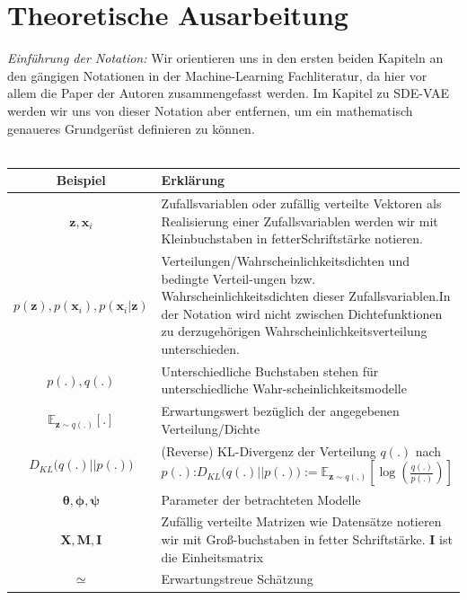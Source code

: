 \documentclass[12pt]{article}
\newcommand{\E}{\mathbb{E}}
\newcommand{\z}{\mathbf{z}}
\newcommand{\x}{\mathbf{x}_i}
\begin{document}
	\section[Theoretische Ausarbeitung]{Theoretische Ausarbeitung}
	\emph{Einführung der Notation:} Wir orientieren uns in den ersten beiden Kapiteln an den gängigen Notationen in der Machine-Learning Fachliteratur, da hier vor allem die Paper der Autoren zusammengefasst werden. Im Kapitel zu SDE-VAE werden wir uns von dieser Notation aber entfernen, um ein mathematisch genaueres Grundgerüst definieren zu können.\\ \
	\\
	\begin{tabular}{|c|p{11.9cm}|}
			\hline
			\textbf{Beispiel} & \textbf{Erklärung}  \\
			\hline
			$\z, \x$ &  Zufallsvariablen oder zufällig verteilte Vektoren als Realisierung \newline einer Zufallsvariablen werden wir mit Kleinbuchstaben in fetter\newline Schriftstärke notieren.  \\
			\hline
			$p(\z), p(\x), p(\x|\z)$ & Verteilungen/Wahrscheinlichkeitsdichten und bedingte Verteil-\newline ungen bzw. Wahrscheinlichkeitsdichten dieser Zufallsvariablen.\newline In der Notation wird nicht zwischen Dichtefunktionen zu der\newline zugehörigen Wahrscheinlichkeitsverteilung unterschieden.\\
			\hline
			$p(.), q(.)$ & Unterschiedliche Buchstaben stehen für unterschiedliche Wahr-\newline scheinlichkeitsmodelle\\
			\hline
			$\E_{\z\sim q(.)}[.]$ & Erwartungswert bezüglich der angegebenen Verteilung/Dichte\\
			\hline
			$D_{KL}\big(q(.)||p(.)\big)$ & (Reverse) KL-Divergenz der Verteilung $q(.)$ nach $p(.)$:\newline $D_{KL}\big(q(.)||p(.)\big):= \E_{\z\sim q(.)}\left[\log\left(\tfrac{q(.)}{p(.)}\right)\right]$ \\
			\hline
			$\boldsymbol\theta, \boldsymbol\phi, \boldsymbol\psi $ & Parameter der betrachteten Modelle \\
			\hline
			$\mathbf{X}, \mathbf{M}, \mathbf{I} $ & Zufällig verteilte Matrizen wie Datensätze notieren wir mit Groß-\newline buchstaben in fetter Schriftstärke. $\mathbf{I}$ ist die Einheitsmatrix \\
			\hline
			$\simeq $ & Erwartungstreue Schätzung \\
			\hline
		\end{tabular}
	\vspace{1cm}
\end{document}
